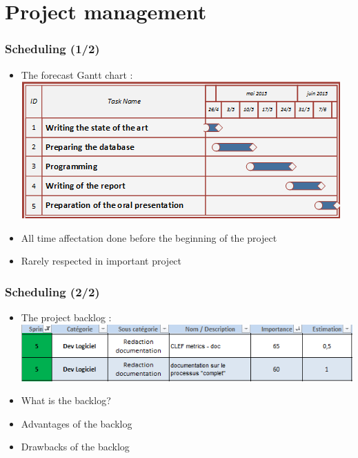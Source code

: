 \documentclass[xcolor=table]{beamer}
\begin{document}
\section{Project management}




\begin{frame} \frametitle{Scheduling (1/2)}

\begin{itemize}
\item The forecast Gantt chart  :
\includegraphics[scale=0.80]{GanttPrez.png}
\item All time affectation done before the beginning of the project
\item Rarely respected in important project
\end{itemize}

\end{frame}


\begin{frame} \frametitle{Scheduling (2/2)}


\begin{itemize}
\item The project backlog  :
\includegraphics[scale=0.50]{backlog.png}
\item What is the backlog?
\item Advantages of the backlog
\item Drawbacks of the backlog
\end{itemize}


\end{frame}
\end{document}
